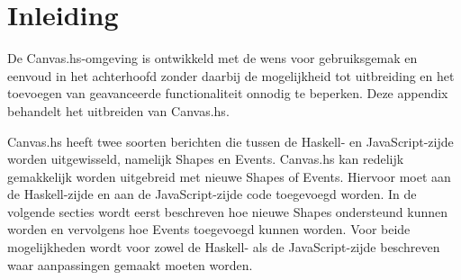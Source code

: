 \section{Inleiding}
De Canvas.hs-omgeving is ontwikkeld met de wens voor gebruiksgemak en eenvoud in het achterhoofd zonder daarbij de mogelijkheid tot uitbreiding en het toevoegen van geavanceerde functionaliteit onnodig te beperken. Deze appendix behandelt het uitbreiden van Canvas.hs.

Canvas.hs heeft twee soorten berichten die tussen de Haskell- en JavaScript-zijde worden uitgewisseld, namelijk Shapes en Events. Canvas.hs kan redelijk gemakkelijk worden uitgebreid met nieuwe Shapes of Events. Hiervoor moet aan de Haskell-zijde en aan de JavaScript-zijde code toegevoegd worden. In de volgende secties wordt eerst beschreven hoe nieuwe Shapes ondersteund kunnen worden en vervolgens hoe Events toegevoegd kunnen worden. Voor beide mogelijkheden wordt voor zowel de Haskell- als de JavaScript-zijde beschreven waar aanpassingen gemaakt moeten worden.